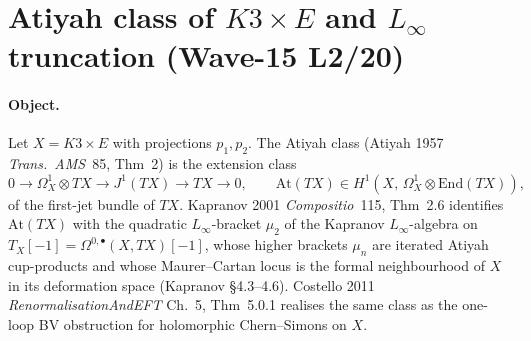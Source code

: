
\providecommand{\At}{\mathrm{At}}
\providecommand{\Obs}{\mathrm{Obs}}
\providecommand{\hCS}{\mathrm{hCS}}
\providecommand{\MC}{\mathrm{MC}}
\providecommand{\End}{\mathrm{End}}
\providecommand{\Td}{\mathrm{Td}}
\providecommand{\ch}{\mathrm{ch}}
\providecommand{\dbar}{\bar\partial}
\providecommand{\cE}{\mathcal{E}}
\providecommand{\cO}{\mathcal{O}}
\providecommand{\cH}{\mathcal{H}}
\providecommand{\cK}{\mathcal{K}}
\providecommand{\C}{\mathbb{C}}
\providecommand{\Z}{\mathbb{Z}}
\providecommand{\kch}{\kappa_{\mathrm{ch}}}
\providecommand{\kcat}{\kappa_{\mathrm{cat}}}
\providecommand{\ClaimStatusTheorem}{\textsc{[theorem]}}
\providecommand{\ClaimStatusConjectured}{\textsc{[conjectural]}}

\section*{Atiyah class of $K3 \times E$ and $L_\infty$ truncation (Wave-15 L2/20)}

\paragraph{Object.}
Let $X = K3 \times E$ with projections $p_1, p_2$. The Atiyah class
(Atiyah 1957 \emph{Trans.\ AMS}~85, Thm~2) is the extension class
\[
  0 \to \Omega^1_X \otimes TX \to J^1(TX) \to TX \to 0,
  \qquad
  \At(TX) \in H^1(X,\, \Omega^1_X \otimes \End(TX)),
\]
of the first-jet bundle of $TX$. Kapranov 2001 \emph{Compositio}~115,
Thm~2.6 identifies $\At(TX)$ with the quadratic $L_\infty$-bracket
$\mu_2$ of the Kapranov $L_\infty$-algebra on
$T_X[-1] = \Omega^{0,\bullet}(X, TX)[-1]$, whose higher brackets
$\mu_n$ are iterated Atiyah cup-products and whose Maurer--Cartan
locus is the formal neighbourhood of $X$ in its deformation space
(Kapranov \S4.3--4.6). Costello 2011 \emph{RenormalisationAndEFT} Ch.~5,
Thm~5.0.1 realises the same class as the one-loop BV obstruction for
holomorphic Chern--Simons on $X$.

